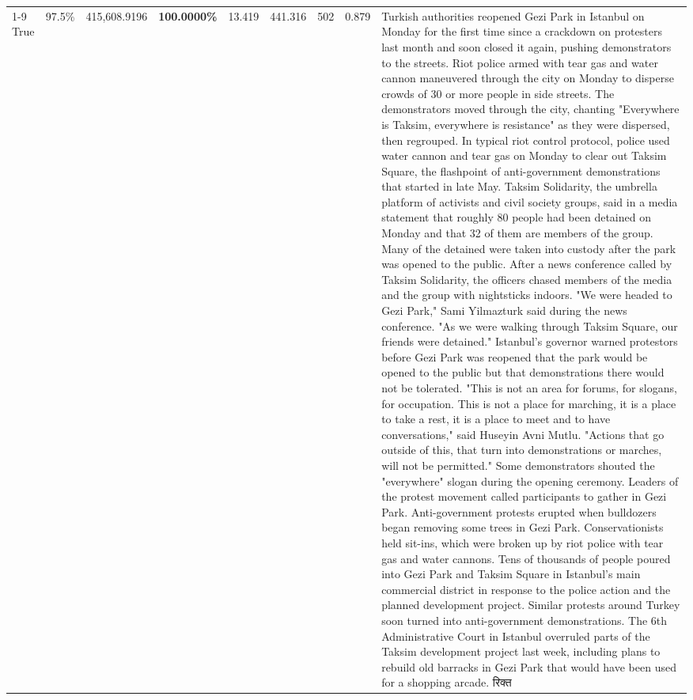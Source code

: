 \begin{table}[H]
\begin{tabular}{lllrlllll}
\cline{1-9}
True & 97.5\% & 415,608.9196 & \bfseries \color{red} 100.0000\% & 13.419 & 441.316 & 502 & 0.879 & Turkish authorities reopened Gezi Park in Istanbul on Monday for the first time since a crackdown on protesters last month and soon closed it again, pushing demonstrators to the streets. Riot police armed with tear gas and water cannon maneuvered through the city on Monday to disperse crowds of 30 or more people in side streets. The demonstrators moved through the city, chanting "Everywhere is Taksim, everywhere is resistance" as they were dispersed, then regrouped. In typical riot control protocol, police used water cannon and tear gas on Monday to clear out Taksim Square, the flashpoint of anti-government demonstrations that started in late May. Taksim Solidarity, the umbrella platform of activists and civil society groups, said in a media statement that roughly 80 people had been detained on Monday and that 32 of them are members of the group. Many of the detained were taken into custody after the park was opened to the public. After a news conference called by Taksim Solidarity, the officers chased members of the media and the group with nightsticks indoors. "We were headed to Gezi Park," Sami Yilmazturk said during the news conference. "As we were walking through Taksim Square, our friends were detained." Istanbul's governor warned protestors before Gezi Park was reopened that the park would be opened to the public but that demonstrations there would not be tolerated. "This is not an area for forums, for slogans, for occupation. This is not a place for marching, it is a place to take a rest, it is a place to meet and to have conversations," said Huseyin Avni Mutlu. "Actions that go outside of this, that turn into demonstrations or marches, will not be permitted." Some demonstrators shouted the "everywhere" slogan during the opening ceremony. Leaders of the protest movement called participants to gather in Gezi Park. Anti-government protests erupted when bulldozers began removing some trees in Gezi Park. Conservationists held sit-ins, which were broken up by riot police with tear gas and water cannons. Tens of thousands of people poured into Gezi Park and Taksim Square in Istanbul's main commercial district in response to the police action and the planned development project. Similar protests around Turkey soon turned into anti-government demonstrations. The 6th Administrative Court in Istanbul overruled parts of the Taksim development project last week, including plans to rebuild old barracks in Gezi Park that would have been used for a shopping arcade. रिक्त \\

\end{tabular}
\end{table}
